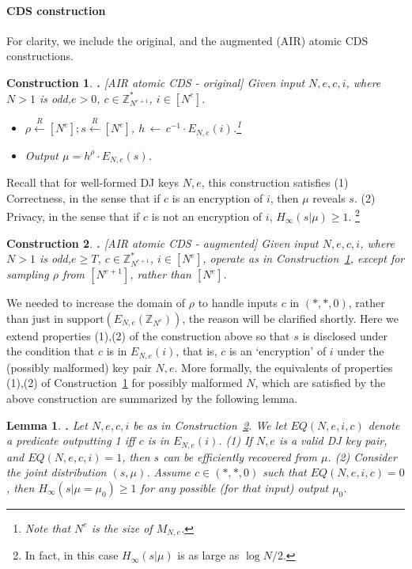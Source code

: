 \documentclass{article}
\newcommand{\encr}[2]{E_{#1}(#2)}
\newcommand{\encdj}{{E}_{N,e}}
\newcommand{\support}{{\mathrm{support}}}
\newcommand{\plain}{{{M}}}
\newcommand{\plaintext}[1]{\plain_{#1}}
\newcommand{\Z}{{\mathbb{Z}}}
\newtheorem{LEMMA}{Lemma}[section]
\newenvironment{lemma}{\begin{LEMMA} \hspace{-.85em} {\bf .} \rm}%
	{\end{LEMMA}}
\newtheorem{CONSTRUCTION}{Construction}[section]
\newenvironment{construction}{\begin{CONSTRUCTION} \hspace{-.85em} {\bf .} \rm}%
	{\end{CONSTRUCTION}}
\newcommand{\from}{{\,\leftarrow\,}}
\newcommand{\samp}[2]{#1\from #2}
\newcommand{\usamp}[2]{#1\stackrel{R}{\leftarrow}#2}
\newcommand{\U}[1]{\mathbb{Z}_{#1}^*}
\begin{document}
\paragraph{CDS construction}
For clarity, we include the original, and the augmented (AIR) atomic CDS constructions.
\begin{construction}[AIR atomic CDS - original]
\label{con-air-cds-orig}
Given input $N,e,c,i$, where $N>1$ is odd,$e>0$, $c\in \U{N^{e+1}}$, $i\in [N^e]$.
\begin{itemize}
  \item $\usamp{\rho}{[N^e]};\usamp{s}{[N^e]}$, $\samp{h}{c^{-1}\cdot \encr{N,e}{i}}$.\footnote{Note that $N^e$
    is the size of $\plaintext{N,e}$.}
    \item Output $\mu=h^{\rho}\cdot\encr{N,e}{s}$.
  \end{itemize}
\end{construction}
Recall that for well-formed DJ keys $N,e$, this construction satisfies (1) Correctness, in the sense that if $c$ is an encryption
of $i$, then $\mu$ reveals $s$. (2) Privacy, in the sense that if $c$ is not an encryption of $i$, $H_\infty(s|\mu)\geq 1$. \footnote{In fact, in this case $H_\infty(s|\mu)$ is as large as $\log{N}/2$.}
\begin{construction}[AIR atomic CDS - augmented]
  \label{con-air-cds-aug}
  Given input $N,e,c,i$, where $N>1$ is odd,$e\geq T$, $c\in \U{N^{e+1}}$, $i\in [N^e]$,
  operate as in Construction~\ref{con-air-cds-orig}, except for sampling $\rho$ from $[N^{e+1}]$,
  rather than $[N^e]$.
\end{construction}
We needed to increase the domain of $\rho$ to handle inputs $c$ in
$(*,*,0)$, rather than just in $\support(\encdj(\Z_{N^e}))$, the
reason will be clarified shortly. Here we extend properties (1),(2) of the construction above so that
$s$ is disclosed under the condition that $c$ is in $\encdj(i)$, that is,
$c$ is an `encryption' of $i$ under the (possibly malformed) key
pair $N,e$. More formally, the equivalents of properties (1),(2) of Construction~\ref{con-air-cds-orig} 
for possibly malformed $N$, which are satisfied by the above
construction are summarized by the following lemma.
\begin{lemma}
  \label{lem-air-cds-priv}
  Let $N,e,c,i$ be as in Construction~\ref{con-air-cds-aug}. We
  let $EQ(N,e,i,c)$ denote a predicate outputting 1 iff $c$ is in $\encdj(i)$.
  (1) If $N,e$ is a valid DJ key pair, and $EQ(N,e,c,i)=1$, then $s$ can be efficiently recovered from $\mu$.
  (2) Consider the joint distribution $(s,\mu)$. Assume $c\in (*,*,0)$ such that $EQ(N,e,i,c)=0$,
  then $H_{\infty}(s|\mu=\mu_0) \geq 1$ for any possible (for that input) output $\mu_0$.
\end{lemma}
\end{document}
